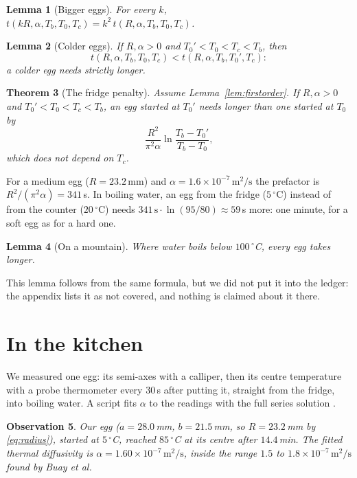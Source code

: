 \documentclass[11pt]{article}
\newtheorem{theorem}{Theorem}
\newtheorem{lemma}[theorem]{Lemma}
\newtheorem{observation}[theorem]{Observation}
\begin{document}
\begin{lemma}[Bigger eggs]\label{lem:scaling}
  For every $k$, $t(kR, \alpha, T_b, T_0, T_c) = k^2\, t(R, \alpha, T_b, T_0, T_c)$.
\end{lemma}

\begin{lemma}[Colder eggs]\label{lem:colder}
  If $R, \alpha > 0$ and $T_0' < T_0 < T_c < T_b$, then
  \[ t(R, \alpha, T_b, T_0, T_c) < t(R, \alpha, T_b, T_0', T_c): \]
  a colder egg needs strictly longer.
\end{lemma}

\begin{theorem}[The fridge penalty]\label{thm:fridge}
  Assume Lemma~\ref{lem:firstorder}. If $R, \alpha > 0$ and $T_0' < T_0 < T_c < T_b$, an egg started at $T_0'$
  needs longer than one started at $T_0$ by
  \[ \frac{R^2}{\pi^2 \alpha} \ln \frac{T_b - T_0'}{T_b - T_0}, \]
  which does not depend on $T_c$.
\end{theorem}

For a medium egg ($R = 23.2$\,mm) and $\alpha = 1.6 \times 10^{-7}\,\mathrm{m^2/s}$ the prefactor is
$R^2/(\pi^2\alpha) = 341$\,s. In boiling water, an egg from the fridge ($5\,^\circ$C) instead of from the
counter ($20\,^\circ$C) needs $341\,\mathrm{s} \cdot \ln(95/80) \approx 59$\,s more: one minute, for a soft
egg as for a hard one.

\begin{lemma}[On a mountain]\label{lem:altitude}
  Where water boils below $100\,^\circ$C, every egg takes longer.
\end{lemma}

This lemma follows from the same formula, but we did not put it into the ledger: the appendix lists it as
not covered, and nothing is claimed about it there.

\section{In the kitchen}

We measured one egg: its semi-axes with a calliper, then its centre temperature with a probe thermometer every
30\,s after putting it, straight from the fridge, into boiling water. A script fits $\alpha$ to the readings
with the full series solution \cite[eq.~(5)]{Buay2006}.

\begin{observation}\label{obs:kitchen}
  Our egg ($a = 28.0$\,mm, $b = 21.5$\,mm, so $R = 23.2$\,mm by \eqref{eq:radius}), started at $5\,^\circ$C,
  reached $85\,^\circ$C at its centre after $14.4$\,min. The fitted thermal diffusivity is
  $\alpha = 1.60 \times 10^{-7}\,\mathrm{m^2/s}$, inside the range $1.5$ to $1.8 \times 10^{-7}\,\mathrm{m^2/s}$
  found by Buay et al.
\end{observation}
\end{document}
